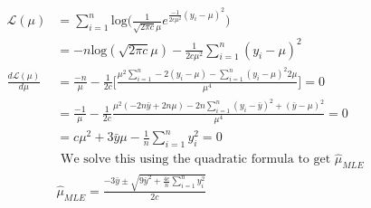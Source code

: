 \documentclass[11pt]{article}
\begin{document}
\begin{equation}
  \nonumber
  \begin{aligned}
    \mathcal{L}(\mu) & = \sum_{i = 1}^{n}\text{log}\bigg(\frac{1}{\sqrt{2 \pi c} \mu} e^{\frac{-1}{2c\mu^{2}}(y_{i} - \mu)^{2}}\bigg)\\
    & = -n\text{log}(\sqrt{2 \pi c} \mu) - \frac{1}{2c \mu^{2}} \sum_{i = 1}^{n} (y_{i} - \mu)^{2}\\
    \frac{d \mathcal{L}(\mu)}{d \mu} & = \frac{-n}{\mu} - \frac{1}{2c}\bigg[\frac{\mu^{2}\sum_{i = 1}^{n}-2(y_{i} - \mu) - \sum_{i = 1}^{n} (y_{i} - \mu)^{2}2 \mu}{\mu^{4}}\bigg] = 0\\
    & = \frac{-1}{\mu} - \frac{1}{2c}\frac{\mu^{2}(-2n\bar{y} + 2n\mu) - 2n \sum_{i = 1}^{n} (y_{i} - \bar{y})^{2} + (\bar{y} - \mu)^{2}}{\mu^{4}} = 0\\
    & = c \mu^{2} + 3\bar{y}\mu - \frac{1}{n}\sum_{i = 1}^{n}y_{i}^{2} = 0\\
    & \text{ We solve this using the quadratic formula to get }\hat{\mu}_{MLE} \\
    & \hat{\mu}_{MLE} = \frac{-3\bar{y} \pm \sqrt{9 \bar{y}^{2} + \frac{4c}{n}\sum_{i = 1}^{n} y_{i}^{2}}}{2c}
  \end{aligned}
\end{equation}
\end{document}
